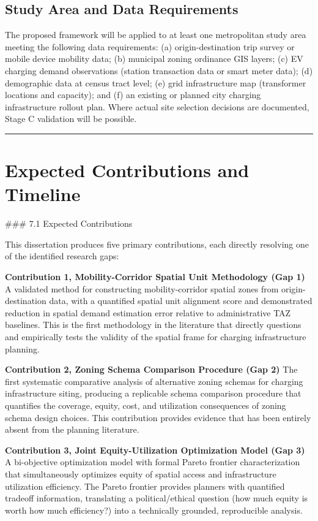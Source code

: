 \documentclass[letterpaper, 12pt, oneside, doublespacing]{Thesis}
\begin{document}
\section{Study Area and Data Requirements}

The proposed framework will be applied to at least one metropolitan study area meeting the following data requirements: (a) origin-destination trip survey or mobile device mobility data; (b) municipal zoning ordinance GIS layers; (c) EV charging demand observations (station transaction data or smart meter data); (d) demographic data at census tract level; (e) grid infrastructure map (transformer locations and capacity); and (f) an existing or planned city charging infrastructure rollout plan. Where actual site selection decisions are documented, Stage C validation will be possible.

\bigskip\noindent\rule{\linewidth}{0.4pt}\bigskip


\iffalse %
\chapter{Expected Contributions and Timeline}

\#\#\# 7.1 Expected Contributions

This dissertation produces five primary contributions, each directly resolving one of the identified research gaps:

\textbf{Contribution 1, Mobility-Corridor Spatial Unit Methodology (Gap 1)}
A validated method for constructing mobility-corridor spatial zones from origin-destination data, with a quantified spatial unit alignment score and demonstrated reduction in spatial demand estimation error relative to administrative TAZ baselines. This is the first methodology in the literature that directly questions and empirically tests the validity of the spatial frame for charging infrastructure planning.

\textbf{Contribution 2, Zoning Schema Comparison Procedure (Gap 2)}
The first systematic comparative analysis of alternative zoning schemas for charging infrastructure siting, producing a replicable schema comparison procedure that quantifies the coverage, equity, cost, and utilization consequences of zoning schema design choices. This contribution provides evidence that has been entirely absent from the planning literature.

\textbf{Contribution 3, Joint Equity-Utilization Optimization Model (Gap 3)}
A bi-objective optimization model with formal Pareto frontier characterization that simultaneously optimizes equity of spatial access and infrastructure utilization efficiency. The Pareto frontier provides planners with quantified tradeoff information, translating a political/ethical question (how much equity is worth how much efficiency?) into a technically grounded, reproducible analysis.
\end{document}

